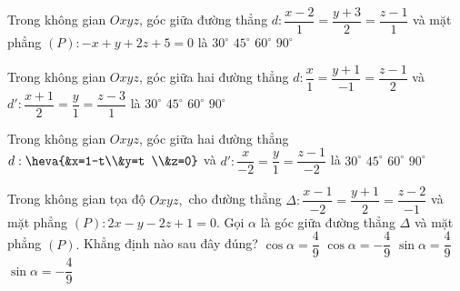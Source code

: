 	\begin{ex}%
	Trong không gian $Oxyz$, góc giữa đường thẳng $d:\dfrac{x-2}{1}=\dfrac{y+3}{2}=\dfrac{z-1}{1}$ và mặt phẳng $(P):-x+y+2z+5=0$ là
	\choice
	{$30^{\circ}$}
	{\True $45^{\circ}$}
	{$60^{\circ}$}
	{$90^{\circ}$}
	\end{ex}
	\begin{ex}%
	Trong không gian $Oxyz$, góc giữa hai đường thẳng $d:\dfrac{x}{1}=\dfrac{y+1}{-1}=\dfrac{z-1}{2}$ và $d': \dfrac{x+1}{2}=\dfrac{y}{1}=\dfrac{z-3}{1}$ là 
	\choice
	{$30^{\circ}$}
	{$45^{\circ}$}
	{\True $60^{\circ}$}
	{$90^{\circ}$}
	\end{ex}
	\begin{ex}%
	Trong không gian $Oxyz$, góc giữa hai đường thẳng $d:\heva{&x=1-t\\&y=t \\&z=0}$ và \break $d': \dfrac{x}{-2}=\dfrac{y}{1}=\dfrac{z-1}{-2}$ là 
	\choice
	{$30^{\circ}$}
	{\True $45^{\circ}$}
	{$60^{\circ}$}
	{$90^{\circ}$}
	\end{ex}
	\begin{ex}%
	Trong không gian tọa độ $Oxyz,$ cho đường thẳng $\Delta\colon \dfrac{x-1}{-2}=\dfrac{y+1}2=\dfrac{z-2}{-1}$ và mặt phẳng $(P)\colon 2x-y-2z+1=0.$ Gọi $\alpha$ là góc giữa đường thẳng $\Delta$ và mặt phẳng $(P).$ Khẳng định nào sau đây đúng?
	\choice
	{$\cos \alpha=\dfrac49$}
	{$\cos \alpha=-\dfrac49$}
	{\True $\sin \alpha=\dfrac49$}
	{$\sin \alpha=-\dfrac49$}
	\end{ex}
